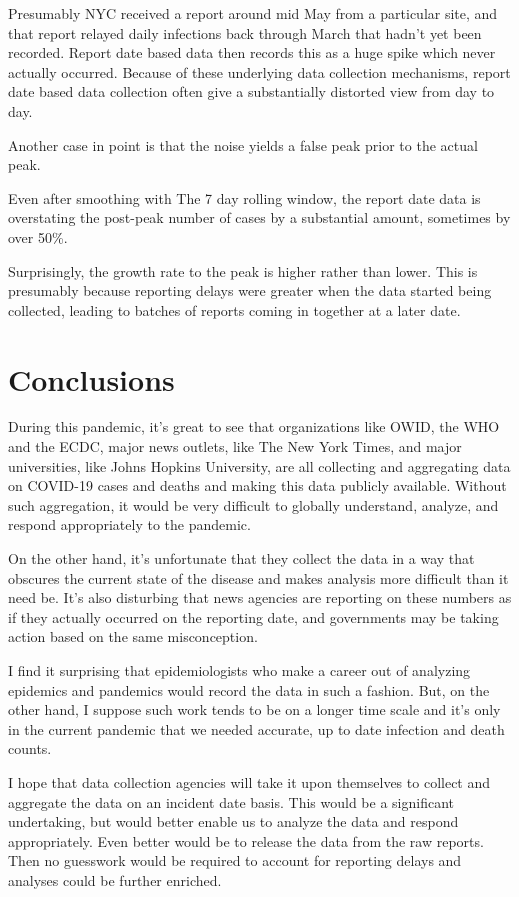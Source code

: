 \documentclass[10pt,reqno]{amsart}
\begin{document}
Presumably NYC received a report around mid May from a particular
site, and that report relayed daily infections back through March that
hadn't yet been recorded.  Report date based data then records this as
a huge spike which never actually occurred.  Because of these
underlying data collection mechanisms, report date based data
collection often give a substantially distorted view from day to day.

Another case in point is that the noise yields a false peak prior to
the actual peak.

Even after smoothing with The 7 day rolling window, the report date
data is overstating the post-peak number of cases by a substantial
amount, sometimes by over 50\%.

Surprisingly, the growth rate to the peak is higher rather than lower.
This is presumably because reporting delays were greater when the data
started being collected, leading to batches of reports coming in
together at a later date.

\section{Conclusions}
During this pandemic, it's great to see that organizations like OWID, the
WHO and the ECDC, major news outlets, like The New York Times, and
major universities, like Johns Hopkins University, are all collecting
and aggregating data on COVID-19 cases and deaths and making this data
publicly available.  Without such aggregation, it would be very
difficult to globally understand, analyze, and respond appropriately
to the pandemic.

On the other hand, it's unfortunate that they collect the data in a
way that obscures the current state of the disease and makes analysis
more difficult than it need be.  It's also disturbing that news
agencies are reporting on these numbers as if they actually occurred
on the reporting date, and governments may be taking action based on
the same misconception.

I find it surprising that epidemiologists who make a career out of
analyzing epidemics and pandemics would record the data in such a
fashion.  But, on the other hand, I suppose such work tends to be on a
longer time scale and it's only in the current pandemic that we needed
accurate, up to date infection and death counts.

I hope that data collection agencies will take it upon themselves to
collect and aggregate the data on an incident date basis.  This would
be a significant undertaking, but would better enable us to analyze
the data and respond appropriately.  Even better would be to release
the data from the raw reports.  Then no guesswork would be required to
account for reporting delays and analyses could be further enriched.

\printbibliography
\end{document}
